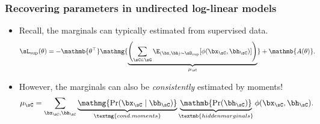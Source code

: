 \documentclass[xcolor={svgnames}]{beamer}
\begin{document}
\begin{frame}
  \frametitle{Recovering parameters in undirected log-linear models}

    \begin{itemize}
      \item<1-> Recall, the marginals can typically estimated from
        supervised data. 
          \begin{align*}
          \label{eqn:logLinearSupervised}
          \sL_\text{sup}(\theta) &= -\mathmb{\theta^\top} \mathmg{\underbrace{\left(\sum_{\sC \in \sG} \E_{(\bx,\bh) \sim \sD_\text{sup}}[\phi(\bx_\sC,\bh_\sC)]\right)}_{\mu_\sC}} + \mathmb{A(\theta)}.
          \end{align*}
        \item<2-> However, the marginals can also be {\em consistently}
          estimated by moments!
        \begin{align*}
          \mu_\sC &= \sum_{\bx_\sC, \bh_\sC} \underbrace{\mathmg{\Pr(\bx_\sC \given \bh_\sC)}}_{\textmg{cond. moments}} 
          \underbrace{\mathmb{\Pr(\bh_\sC)}}_{\textmb{hidden marginals}} \phi(\bx_\sC,\bh_\sC).
        \end{align*}
    \end{itemize}
\end{frame}
\end{document}

